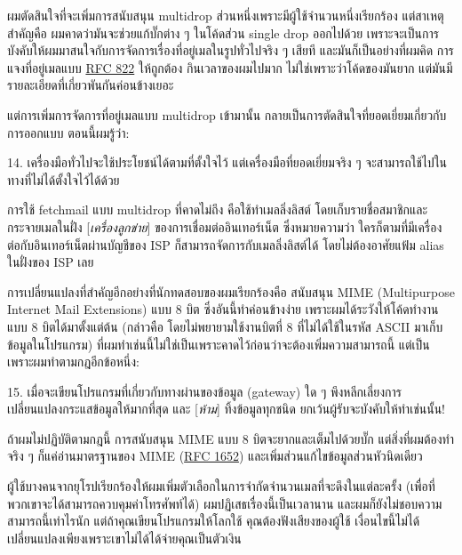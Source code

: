 ผมตัดสินใจที่จะเพิ่มการสนับสนุน multidrop
ส่วนหนึ่งเพราะมีผู้ใช้จำนวนหนึ่งเรียกร้อง แต่สาเหตุสำคัญคือ
ผมคาดว่ามันจะช่วยแก้บั๊กต่าง ๆ  ในโค้ดส่วน single drop ออกไปด้วย
เพราะจะเป็นการบังคับให้ผมมาสนใจกับการจัดการเรื่องที่อยู่เมลในรูปทั่วไปจริง ๆ
เสียที และมันก็เป็นอย่างที่ผมคิด การแจงที่อยู่เมลแบบ
\href{http://info.internet.isi.edu:80/in-notes/rfc/files/rfc822.txt}{RFC
  822} ให้ถูกต้อง กินเวลาของผมไปมาก ไม่ใช่เพราะว่าโค้ดของมันยาก
แต่มันมีรายละเอียดที่เกี่ยวพันกันค่อนข้างเยอะ

แต่การเพิ่มการจัดการที่อยู่เมลแบบ multidrop เข้ามานั้น
กลายเป็นการตัดสินใจที่ยอดเยี่ยมเกี่ยวกับการออกแบบ ตอนนี้ผมรู้ว่า:

\begin{fancyquotes}
  14. เครื่องมือทั่วไปจะใช้ประโยชน์ได้ตามที่ตั้งใจไว้
  แต่เครื่องมือที่ยอดเยี่ยมจริง ๆ
  จะสามารถใช้ไปในทางที่ไม่ได้ตั้งใจไว้ได้ด้วย
\end{fancyquotes}

การใช้ fetchmail แบบ multidrop ที่คาดไม่ถึง คือใช้ทำเมลลิ่งลิสต์
โดยเก็บรายชื่อสมาชิกและกระจายเมลในฝั่ง {[}\emph{เครื่องลูกข่าย}{]}
ของการเชื่อมต่ออินเทอร์เน็ต ซึ่งหมายความว่า
ใครก็ตามที่มีเครื่องต่อกับอินเทอร์เน็ตผ่านบัญชีของ ISP
ก็สามารถจัดการกับเมลลิ่งลิสต์ได้ โดยไม่ต้องอาศัยแฟ้ม alias ในฝั่งของ ISP
เลย

การเปลี่ยนแปลงที่สำคัญอีกอย่างที่นักทดสอบของผมเรียกร้องคือ สนับสนุน MIME
(Multipurpose Internet Mail Extensions) แบบ 8 บิต
ซึ่งอันนี้ทำค่อนข้างง่าย เพราะผมได้ระวังให้โค้ดทำงานแบบ 8
บิตได้มาตั้งแต่ต้น (กล่าวคือ โดยไม่พยายามใช้งานบิตที่ 8
ที่ไม่ได้ใช้ในรหัส ASCII มาเก็บข้อมูลในโปรแกรม)
ที่ผมทำเช่นนี้ไม่ใช่เป็นเพราะคาดไว้ก่อนว่าจะต้องเพิ่มความสามารถนี้
แต่เป็นเพราะผมทำตามกฎอีกข้อหนึ่ง:

\begin{fancyquotes}
  15. เมื่อจะเขียนโปรแกรมที่เกี่ยวกับทางผ่านของข้อมูล (gateway) ใด ๆ
  พึงหลีกเลี่ยงการเปลี่ยนแปลงกระแสข้อมูลให้มากที่สุด และ {[}\emph{ห้าม}{]}
  ทิ้งข้อมูลทุกชนิด ยกเว้นผู้รับจะบังคับให้ทำเช่นนั้น!
\end{fancyquotes}

ถ้าผมไม่ปฏิบัติตามกฎนี้ การสนับสนุน MIME แบบ 8 บิตจะยากและเต็มไปด้วยบั๊ก
แต่สิ่งที่ผมต้องทำจริง ๆ  ก็แค่อ่านมาตรฐานของ MIME
(\href{http://info.internet.isi.edu:80/in-notes/rfc/files/rfc1652.txt}{RFC
  1652}) และเพิ่มส่วนแก้ไขข้อมูลส่วนหัวนิดเดียว

ผู้ใช้บางคนจากยุโรปเรียกร้องให้ผมเพิ่มตัวเลือกในการจำกัดจำนวนเมลที่จะดึงในแต่ละครั้ง
(เพื่อที่พวกเขาจะได้สามารถควบคุมค่าโทรศัพท์ได้)
ผมปฏิเสธเรื่องนี้เป็นเวลานาน และผมก็ยังไม่ชอบความสามารถนี้เท่าไรนัก
แต่ถ้าคุณเขียนโปรแกรมให้โลกใช้ คุณต้องฟังเสียงของผู้ใช้
เงื่อนไขนี้ไม่ได้เปลี่ยนแปลงเพียงเพราะเขาไม่ได้ได้จ่ายคุณเป็นตัวเงิน